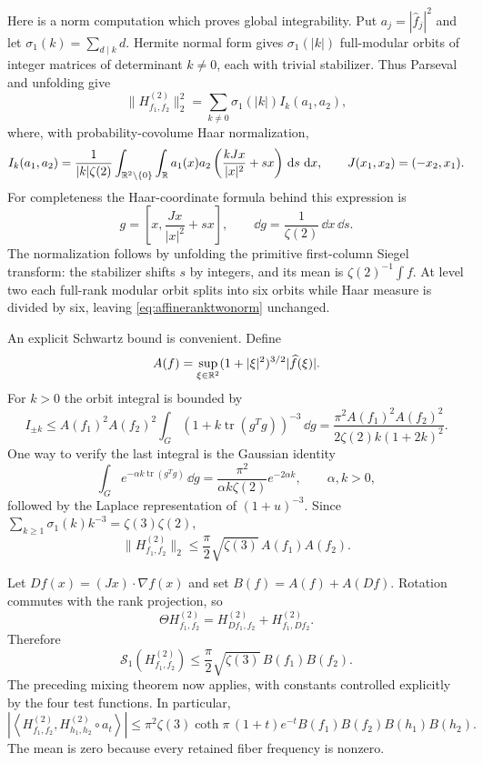 Here is a norm computation which proves global integrability. Put
$a_j=|\widehat f_j|^2$ and let $\sigma_1(k)=\sum_{d\mid k}d$.
Hermite normal form gives $\sigma_1(|k|)$ full-modular orbits of
integer matrices of determinant $k\ne0$, each with trivial stabilizer.
Thus Parseval and unfolding give
\begin{equation}
 \|H_{f_1,f_2}^{(2)}\|_2^2
 =\sum_{k\ne0}\sigma_1(|k|)I_k(a_1,a_2),
 \label{eq:affineranktwonorm}
\end{equation}
where, with probability-covolume Haar normalization,
\[
 I_k(a_1,a_2)
 =\frac1{|k|\zeta(2)}
  \int_{\mathbb R^2\setminus\{0\}}\int_\mathbb R
  a_1(x)a_2\left(\frac{kJx}{|x|^2}+sx\right)
  \,\mathop{}\!\mathrm d s\,\mathop{}\!\mathrm d x,
 \qquad J(x_1,x_2)=(-x_2,x_1).
\]
For completeness the Haar-coordinate formula behind this expression is
\[
 g=\left[x,\frac{Jx}{|x|^2}+sx\right],\qquad
 \dd g=\frac1{\zeta(2)}\,\dd x\,\dd s.
\]
The normalization follows by unfolding the primitive first-column
Siegel transform: the stabilizer shifts $s$ by integers, and its mean
is $\zeta(2)^{-1}\int f$. At level two each full-rank modular orbit
splits into six orbits while Haar measure is divided by six, leaving
\eqref{eq:affineranktwonorm} unchanged.

An explicit Schwartz bound is convenient. Define
\[
 A(f)=\sup_{\xi\in\mathbb R^2}
       (1+|\xi|^2)^{3/2}|\widehat f(\xi)|.
\]
For $k>0$ the orbit integral is bounded by
\[
 I_{\pm k}\leq
 A(f_1)^2A(f_2)^2
 \int_G(1+k\operatorname{tr}(g^Tg))^{-3}\,\dd g
 =\frac{\pi^2 A(f_1)^2A(f_2)^2}
        {2\zeta(2)k(1+2k)^2}.
\]
One way to verify the last integral is the Gaussian identity
\[
 \int_G e^{-\alpha k\operatorname{tr}(g^Tg)}\,\dd g
 =\frac{\pi^2}{\alpha k\zeta(2)}e^{-2\alpha k},
 \qquad \alpha,k>0,
\]
followed by the Laplace representation of $(1+u)^{-3}$.
Since $\sum_{k\geq1}\sigma_1(k)k^{-3}=\zeta(3)\zeta(2)$,
\begin{equation}
 \boxed{
 \|H_{f_1,f_2}^{(2)}\|_2
 \leq\frac\pi2\sqrt{\zeta(3)}\,A(f_1)A(f_2).
 }
 \label{eq:affineranktwoschwartz}
\end{equation}

Let $Df(x)=(Jx)\cdot\nabla f(x)$ and set $B(f)=A(f)+A(Df)$.
Rotation commutes with the rank projection, so
\[
 \Theta H_{f_1,f_2}^{(2)}
 =H_{Df_1,f_2}^{(2)}+H_{f_1,Df_2}^{(2)}.
\]
Therefore
\begin{equation}
 \mathcal S_1(H_{f_1,f_2}^{(2)})
 \leq\frac\pi2\sqrt{\zeta(3)}\,B(f_1)B(f_2).
 \label{eq:affineranktwoKnorm}
\end{equation}
The preceding mixing theorem now applies, with constants controlled
explicitly by the four test functions. In particular,
\[
 \left|\left\langle H_{f_1,f_2}^{(2)},
       H_{h_1,h_2}^{(2)}\circ a_t\right\rangle\right|
 \leq\pi^2\zeta(3)\coth\pi\,(1+t)e^{-t}
       B(f_1)B(f_2)B(h_1)B(h_2).
\]
The mean is zero because every retained fiber frequency is nonzero.

